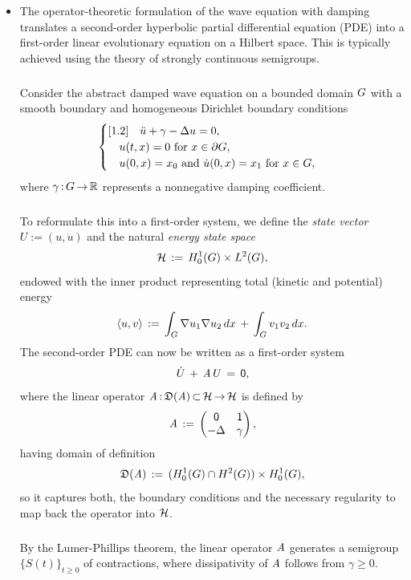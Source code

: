 \documentclass[11pt,twoside]{article}
\begin{document}
\begin{itemize}[leftmargin=12pt,itemsep=5pt]
\item[6.]
The operator-theoretic formulation of the wave equation with damping
translates a second-order hyperbolic partial differential equation (PDE)
into a first-order linear evolutionary equation on a Hilbert space.
This is typically achieved using the theory of strongly continuous semigroups.

\subparagraph{}
Consider the abstract damped wave equation on a bounded domain $\G$
with a smooth boundary and homogeneous Dirichlet boundary conditions
\[
\begin{cases}[1.2]
\quad \ddot{u} + \gamma - \Delta u = 0,\\
\quad u(t,x) = 0 \for x \in \partial \G,\\
\quad u(0,x) = x_0 \and \dot{u}(0,x) = x_1 \for x \in \G,\\
\end{cases}
\]
where $\gamma \: \G \xto \R$ represents a nonnegative damping coefficient.

\subparagraph{}
To reformulate this into a first-order system, we define the \textit{state vector}
$U := (u,\dot{u})$ and the natural \textit{energy state space}
\[
\cal{H} \eqdef \HN{1}{\G} \times \Lh,
\]
endowed with the inner product representing total (kinetic and potential) energy
\[
\scalar{u}{v} \eqdef \int_{\G} \nabla u_1 \nabla u_2 \,dx \+ \int_{\G} v_1 v_2\,dx.
\]
The second-order PDE can now be written as a first-order system
\[
\dot{U} \+ \linA \, U \= \0,
\]
where the linear operator $\linA \: \domain{\linA} \xsubset \cal{H} \xto \cal{H}$
is defined by
\[
\linA \eqdef \begin{pmatrix} \0 & \1 \\ -\Delta & \gamma \end{pmatrix},
\]
having domain of definition
\[
\domain{\linA} \eqdef (\HN{1}{\G} \cap H^2(\G)) \times \HN{1}{\G},
\]
so it captures both,
the boundary conditions and the necessary regularity
to map back the operator into $\cal{H}$.

\subparagraph{}
By the Lumer-Phillips theorem,
the linear operator $\linA$ generates
a semigroup $\{S(t)\}_{t \geq 0}$ of contractions,
where dissipativity of $\linA$ follows from $\gamma \geq 0$.
\end{itemize}

\newpage
\thispagestyle{empty}
\end{document}
